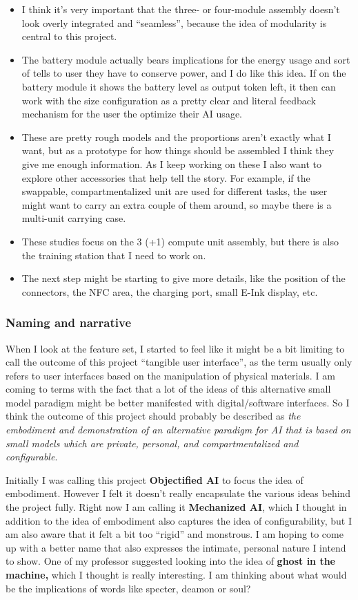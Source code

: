 \documentclass[12pt]{article}
\begin{document}
\begin{itemize}
    \item I think it's very important that the three- or four-module assembly doesn't look overly integrated and ``seamless'', because the idea of modularity is central to this project.
    \item The battery module actually bears implications for the energy usage and sort of tells to user they have to conserve power, and I do like this idea. If on the battery module it shows the battery level as output token left, it then can work with the size configuration as a pretty clear and literal feedback mechanism for the user the optimize their AI usage.
    \item These are pretty rough models and the proportions aren't exactly what I want, but as a prototype for how things should be assembled I think they give me enough information. As I keep working on these I also want to explore other accessories that help tell the story. For example, if the swappable, compartmentalized unit are used for different tasks, the user might want to carry an extra couple of them around, so maybe there is a multi-unit carrying case.
    \item These studies focus on the 3 (+1) compute unit assembly, but there is also the training station that I need to work on.
    \item The next step might be starting to give more details, like the position of the connectors, the NFC area, the charging port, small E-Ink display, etc.
\end{itemize}

\subsubsection*{Naming and narrative}

When I look at the feature set, I started to feel like it might be a bit limiting to call the outcome of this project ``tangible user interface'', as the term usually only refers to user interfaces based on the manipulation of physical materials. I am coming to terms with the fact that a lot of the ideas of this alternative small model paradigm might be better manifested with digital/software interfaces. So I think the outcome of this project should probably be described as \textit{the embodiment and demonstration of an alternative paradigm for AI that is based on small models which are private, personal, and compartmentalized and configurable}.

Initially I was calling this project \textbf{Objectified AI} to focus the idea of embodiment. However I felt it doesn't really encapsulate the various ideas behind the project fully. Right now I am calling it \textbf{Mechanized AI}, which I thought in addition to the idea of embodiment also captures the idea of configurability, but I am also aware that it felt a bit too ``rigid'' and monstrous. I am hoping to come up with a better name that also expresses the intimate, personal nature I intend to show. One of my professor suggested looking into the idea of \textbf{ghost in the machine,} which I thought is really interesting. I am thinking about what would be the implications of words like specter, deamon or soul?
\end{document}
